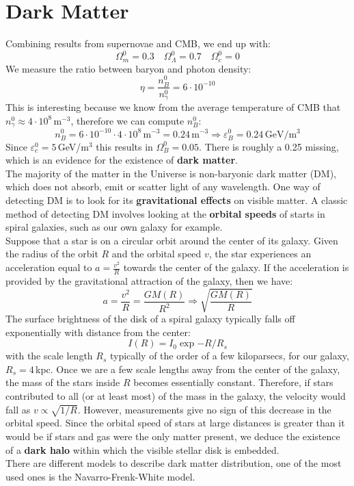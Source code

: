 \documentclass[10.75pt,a4paper,openright,bottom=2cm]{article}
\begin{document}
\section{Dark Matter}
Combining results from supernovae and CMB, we end up with:
\[
\Omega_m^0=0.3 \quad \Omega_\Lambda^0=0.7 \quad \Omega_c^0=0
\]
We measure the ratio between baryon and photon density:
\[\eta=\frac{n_B^0}{n_\gamma^0}=6\cdot10^{-10}
\]
This is interesting because we know from the average temperature of CMB that $n_\gamma^0\approx4\cdot10^8$\,m$^{-3}$, therefore we can compute $n_B^0$:
\[
n_B^0=6\cdot10^{-10}\cdot4\cdot10^8\,\text{m$^{-3}$}=0.24\,\text{m$^{-3}$}\Rightarrow\varepsilon_B^0=0.24\,\text{GeV/m$^3$}
\]
Since $\varepsilon_c^0=5$\,GeV/m$^3$ this results in $\Omega_B^0=0.05$. There is roughly a 0.25 missing, which is an evidence for the existence of \textbf{dark matter}.\\
The majority of the matter in the Universe is non-baryonic dark matter (DM), which does not absorb, emit or scatter light of any wavelength. One way of detecting DM is to look for its \textbf{gravitational effects} on visible matter. A classic method of detecting DM involves looking at the \textbf{orbital speeds} of starts in spiral galaxies, such as our own galaxy for example.\\
Suppose that a star is on a circular orbit around the center of its galaxy. Given the radius of the orbit $R$ and the orbital speed $v$, the star experiences an acceleration equal to $a=\frac{v^2}{R}$ towards the center of the galaxy. If the acceleration is provided by the gravitational attraction of the galaxy, then we have:
\[
a=\frac{v^2}{R}=\frac{GM(R)}{R^2}\Rightarrow\sqrt{\frac{GM(R)}{R}}
\]
The surface brightness of the disk of a spiral galaxy typically falls off exponentially with distance from the center:
\[
I(R)=I_0\exp{-R/R_s}
\]
with the scale length $R_s$ typically of the order of a few kiloparsecs, for our galaxy, $R_s=4$\,kpc. Once we are a few scale lengths away from the center of the galaxy, the mass of the stars inside $R$ becomes essentially constant. Therefore, if stars contributed to all (or at least most) of the mass in the galaxy, the velocity would fall as $v\propto\sqrt{1/R}$. However, measurements give no sign of this decrease in the orbital speed. Since the orbital speed of stars at large distances is greater than it would be if stars and gas were the only matter present, we deduce the existence of a \textbf{dark halo} within which the visible stellar disk is embedded.\\
There are different models to describe dark matter distribution, one of the most used ones is the Navarro-Frenk-White model.
\end{document}
